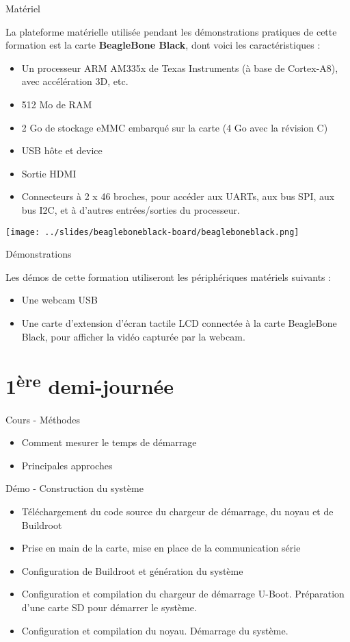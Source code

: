 \documentclass[a4paper,12pt,obeyspaces,spaces,hyphens]{article}
\begin{document}
\feshowtitle

\feshowinfo

\feagendatwocolumn
{Matériel}
{
  La plateforme matérielle utilisée pendant les démonstrations pratiques de
  cette formation est la carte {\bf BeagleBone Black}, dont voici les
  caractéristiques :

  \begin{itemize}
  \item Un processeur ARM AM335x de Texas Instruments (à base de
    Cortex-A8), avec accélération 3D, etc.
  \item 512 Mo de RAM
  \item 2 Go de stockage eMMC embarqué sur la carte
	\newline(4 Go avec la révision C)
  \item USB hôte et device
  \item Sortie HDMI
  \item Connecteurs à 2 x 46 broches, pour accéder aux UARTs, aux
        bus SPI, aux bus I2C, et à d'autres entrées/sorties du
        processeur.
  \end{itemize}
}
{}
{
  \begin{center}
    \texttt{[image: ../slides/beagleboneblack-board/beagleboneblack.png]}
  \end{center}
}

\feagendaonecolumn
{Démonstrations}
{
  Les démos de cette formation utiliseront les périphériques matériels suivants :

  \begin{itemize}
  \item Une webcam USB
  \item Une carte d'extension d'écran tactile LCD connectée à la carte
    BeagleBone Black, pour afficher la vidéo capturée par la webcam.
  \end{itemize}
}

\section{1\textsuperscript{ère} demi-journée}

\feagendatwocolumn
{Cours - Méthodes}
{
  \begin{itemize}
  \item Comment mesurer le temps de démarrage
  \item Principales approches
  \end{itemize}
}
{Démo - Construction du système}
{
 \begin{itemize}
 \item Téléchargement du code source du chargeur de démarrage, du noyau et de Buildroot
 \item Prise en main de la carte, mise en place de la communication série
 \item Configuration de Buildroot et génération du système
 \item Configuration et compilation du chargeur de démarrage U-Boot. Préparation d'une
       carte SD pour démarrer le système.
 \item Configuration et compilation du noyau. Démarrage du système.
 \end{itemize}
}
\end{document}
